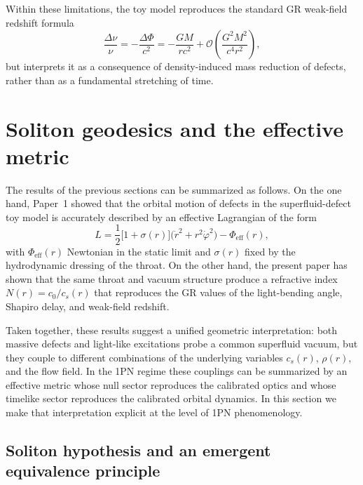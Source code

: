 \documentclass[11pt]{article}
\begin{document}
Within these limitations, the toy model reproduces the standard GR
weak-field redshift formula
\begin{equation}
  \frac{\Delta\nu}{\nu}
  = -\frac{\Delta\Phi}{c^2}
  = -\frac{GM}{r c^2}
  + \mathcal{O}\!\left(\frac{G^2M^2}{c^4 r^2}\right),
\end{equation}
but interprets it as a consequence of density-induced mass reduction of
defects, rather than as a fundamental stretching of time.

\section{Soliton geodesics and the effective metric}
\label{sec:soliton-geodesics}

The results of the previous sections can be summarized as follows.
On the one hand, Paper~1 showed that the orbital motion of defects in the
superfluid-defect toy model is accurately described by an effective
Lagrangian of the form
\begin{equation}
  L
  = \frac{1}{2}\bigl[1 + \sigma(r)\bigr]
      \bigl(\dot r^2 + r^2 \dot\varphi^2\bigr)
    - \Phi_{\mathrm{eff}}(r),
  \label{eq:SG-L-eff-again}
\end{equation}
with $\Phi_{\mathrm{eff}}(r)$ Newtonian in the static limit and $\sigma(r)$
fixed by the hydrodynamic dressing of the throat.
On the other hand, the present paper has shown that the same throat and
vacuum structure produce a refractive index $N(r) = c_0/c_s(r)$ that
reproduces the GR values of the light-bending angle, Shapiro delay, and
weak-field redshift.

Taken together, these results suggest a unified geometric interpretation:
both massive defects and light-like excitations probe a common superfluid
vacuum, but they couple to different combinations of the underlying
variables $c_s(r)$, $\rho(r)$, and the flow field.
In the 1PN regime these couplings can be summarized by an effective metric
whose null sector reproduces the calibrated optics and whose timelike
sector reproduces the calibrated orbital dynamics.
In this section we make that interpretation explicit at the level of
1PN phenomenology.


\subsection{Soliton hypothesis and an emergent equivalence principle}
\label{subsec:soliton-hypothesis}
\end{document}
